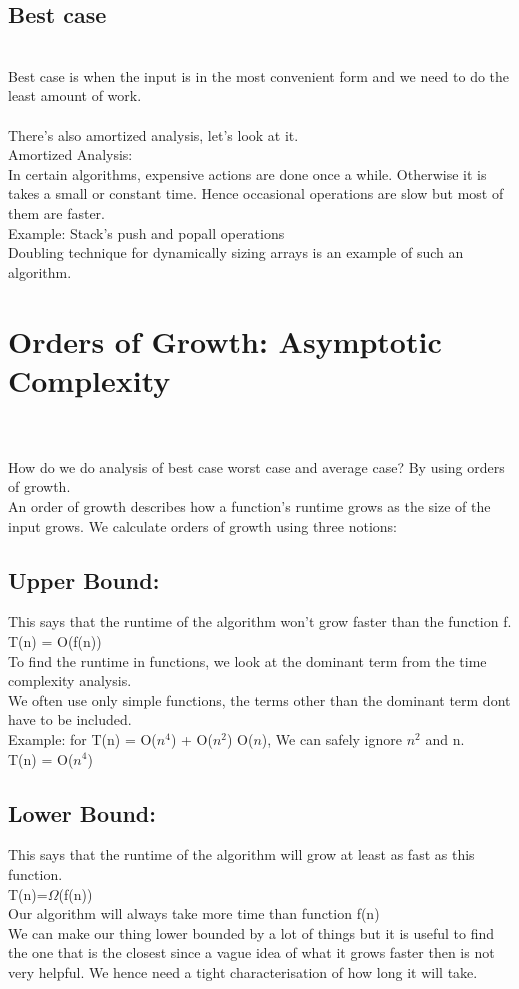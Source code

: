 \subsection{Best case}
\\ Best case is when the input is in the most convenient form and we need to do the least amount of work.
\\ 
\\There's also amortized analysis, let's look at it.
\\Amortized Analysis:
\\In certain algorithms, expensive actions are done once a while. Otherwise it is takes a small or constant time. Hence occasional operations are slow but most of them are faster.
\\Example: Stack's push and popall operations
\\Doubling technique for dynamically sizing arrays is an example of such an algorithm. 



\section{Orders of Growth: Asymptotic Complexity}
\\\\How do we do analysis of best case worst case and average case? By using orders of growth.
\\An order of growth describes how a function's runtime grows as the size of the input grows. We calculate orders of growth using three notions:
\subsection{Upper Bound:} This says that the runtime of the algorithm won't grow faster than the function f.
\\	T(n) = O(f(n))
\\	To find the runtime in functions, we look at the dominant term from the time complexity analysis.
\\	We often use only simple functions, the terms other than the dominant term dont have to be included.
\\ Example: for T(n) = O($n^4$) + O($n^2$) O($n$), We can safely ignore $n^2$ and n. 
\\ T(n) =  O($n^4$)
\subsection{Lower Bound:} This says that the runtime of the algorithm will grow at least as fast as this function.
\\	T(n)=$\Omega$(f(n))
\\	Our algorithm will always take more time than function f(n)
\\	We can make our thing lower bounded by a lot of things but it is useful to find the one that is the closest since a vague idea of what it grows faster then is not very helpful. We hence need a tight characterisation of how long it will take.
